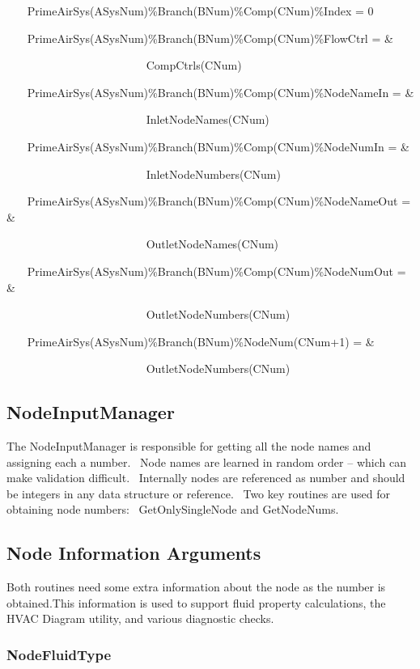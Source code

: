 ~~~ PrimeAirSys(ASysNum)\%Branch(BNum)\%Comp(CNum)\%Index = 0

~~~ PrimeAirSys(ASysNum)\%Branch(BNum)\%Comp(CNum)\%FlowCtrl = \&

~~~~~~~~~~~~~~~~~~~~~~~~ CompCtrls(CNum)

~~~ PrimeAirSys(ASysNum)\%Branch(BNum)\%Comp(CNum)\%NodeNameIn = \&

~~~~~~~~~~~~~~~~~~~~~~~~ InletNodeNames(CNum)

~~~ PrimeAirSys(ASysNum)\%Branch(BNum)\%Comp(CNum)\%NodeNumIn = \&

~~~~~~~~~~~~~~~~~~~~~~~~ InletNodeNumbers(CNum)

~~~ PrimeAirSys(ASysNum)\%Branch(BNum)\%Comp(CNum)\%NodeNameOut = \&

~~~~~~~ ~~~~~~~~~~~~~~~~~OutletNodeNames(CNum)

~~~ PrimeAirSys(ASysNum)\%Branch(BNum)\%Comp(CNum)\%NodeNumOut = \&

~~~~~~~~~~~~~~~~~~~~~~~~ OutletNodeNumbers(CNum)

~~~ PrimeAirSys(ASysNum)\%Branch(BNum)\%NodeNum(CNum+1) = \&

~~~~~~~~~~~~~~~~~~~~~~~~ OutletNodeNumbers(CNum)

\subsection{NodeInputManager}\label{nodeinputmanager}

The NodeInputManager is responsible for getting all the node names and assigning each a number.~ Node names are learned in random order -- which can make validation difficult.~ Internally nodes are referenced as number and should be integers in any data structure or reference.~ Two key routines are used for obtaining node numbers:~ GetOnlySingleNode and GetNodeNums.

\subsection{Node Information Arguments}\label{node-information-arguments}

Both routines need some extra information about the node as the number is obtained.This information is used to support fluid property calculations, the HVAC Diagram utility, and various diagnostic checks.

\subsubsection{NodeFluidType}\label{nodefluidtype}

